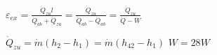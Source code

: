 \( \varepsilon_{ex} = \frac{\dot{Q}_{zu} l}{\dot{Q}_{ab} + \dot{Q}_{zu}} = \frac{\dot{Q}_{zu}}{\dot{Q}_{ab} - \dot{Q}_{ab}} = \frac{\dot{Q}_{zu}}{\dot{Q} - W} \)  

\( \dot{Q}_{zu} = \dot{m} (h_2 - h_1) = \dot{m} (h_{42} - h_1) \)  
\( W = 28W \)